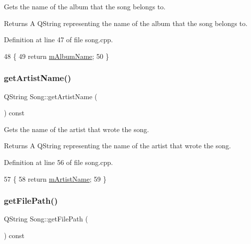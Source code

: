 Gets the name of the album that the song belongs to. 

\begin{DoxyReturn}{Returns}
A Q\+String representing the name of the album that the song belongs to. 
\end{DoxyReturn}


Definition at line 47 of file song.\+cpp.


\begin{DoxyCode}
48 \{
49     \textcolor{keywordflow}{return} \mbox{\hyperlink{class_song_aadf3ea14887a9c5a36a1fe419d7d6222}{mAlbumName}};
50 \}
\end{DoxyCode}
\mbox{\label{class_song_a90ab22ea210ca1552d08f50da4c51ff5}} 
\subsubsection{\texorpdfstring{get\+Artist\+Name()}{getArtistName()}}
{\footnotesize\ttfamily Q\+String Song\+::get\+Artist\+Name (\begin{DoxyParamCaption}{ }\end{DoxyParamCaption}) const}



Gets the name of the artist that wrote the song. 

\begin{DoxyReturn}{Returns}
A Q\+String representing the name of the artist that wrote the song. 
\end{DoxyReturn}


Definition at line 56 of file song.\+cpp.


\begin{DoxyCode}
57 \{
58     \textcolor{keywordflow}{return} \mbox{\hyperlink{class_song_a53eb13c6325e01434ee370ba2d9af292}{mArtistName}};
59 \}
\end{DoxyCode}
\mbox{\label{class_song_a2c71fd5ffa7343e7688554b2f9a10120}} 
\subsubsection{\texorpdfstring{get\+File\+Path()}{getFilePath()}}
{\footnotesize\ttfamily Q\+String Song\+::get\+File\+Path (\begin{DoxyParamCaption}{ }\end{DoxyParamCaption}) const}



